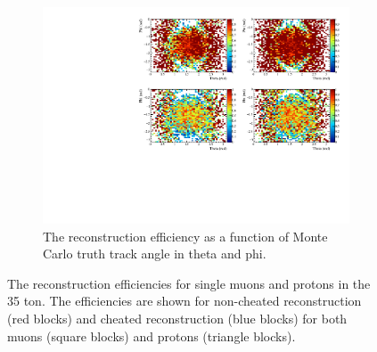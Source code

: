 \begin{figure}[h!]
\begin{subfigure}{.45\textwidth}
        \centering
        \includegraphics[width=\textwidth]{Effic_SingSamps_PhiTheta}
        \caption{The reconstruction efficiency as a function of Monte Carlo truth track angle in theta and phi.}
        \label{fig:Isol_Effic_PhiTheta}
  \end{subfigure}
  \caption[The reconstruction efficiencies for single muons and protons in the 35 ton.]
          {The reconstruction efficiencies for single muons and protons in the 35 ton. The efficiencies are shown for non-cheated reconstruction (red blocks) and cheated reconstruction (blue blocks) for both muons (square blocks) and protons (triangle blocks).}
  \label{fig:Isol_Effic}
\end{figure}

